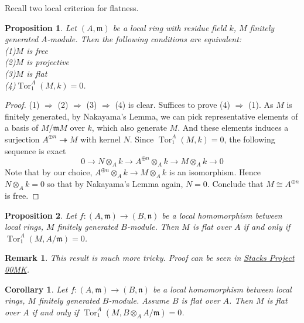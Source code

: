 \documentclass{ctexart}
\newtheorem{remark}{Remark}[section]
\newtheorem{proposition}{Proposition}[section]
\newtheorem{corollary}{Corollary}[section]
\newcommand{\tor}{\operatorname{Tor}}
\begin{document}
Recall two local criterion for flatness.
\begin{proposition}
    Let $(A, \mathfrak{m})$ be a local ring with residue field $k$, $M$ finitely generated $A$-module.
    Then the following conditions are equivalent: \\
    (1)$M$ is free \\
    (2)$M$ is projective \\
    (3)$M$ is flat \\
    (4)$\tor_{1}^{A}(M, k) = 0$.
    \label{Proposition 7.1}
\end{proposition}
\begin{proof}
    (1) $\Rightarrow$ (2) $\Rightarrow$ (3) $\Rightarrow$ (4) is clear.
    Suffices to prove (4) $\Rightarrow$ (1).
    As $M$ is finitely generated, by Nakayama's Lemma, we can pick representative elements of a basis of $M/\mathfrak{m}M$ over $k$, which also generate $M$.
    And these elements induces a surjection $A^{\oplus n} \twoheadrightarrow M$ with kernel $N$.
    Since $\tor_{1}^{A}(M, k) = 0$, the following sequence is exact
    \begin{equation}
        0 \longrightarrow N \otimes_{A} k \longrightarrow A^{\oplus n} \otimes_{A} k \longrightarrow M \otimes_{A} k \longrightarrow 0
    \end{equation}
    Note that by our choice, $A^{\oplus n} \otimes_{A} k \rightarrow M \otimes_{A} k$ is an isomorphism.
    Hence $N \otimes_{A} k = 0$ so that by Nakayama's Lemma again, $N = 0$.
    Conclude that $M \cong A^{\oplus n}$ is free.
\end{proof}
\begin{proposition}
    Let $f: (A, \mathfrak{m}) \rightarrow (B, \mathfrak{n})$ be a local homomorphism between local rings, $M$ finitely generated $B$-module.
    Then $M$ is flat over $A$ if and only if $\tor_{1}^{A}(M, A/\mathfrak{m}) = 0$.
    \label{Proposition 7.2}
\end{proposition}
\begin{remark}
    This result is much more tricky.
    Proof can be seen in \href{https://stacks.math.columbia.edu/tag/00MK}{Stacks Project 00MK}.
\end{remark}
\begin{corollary}
    Let $f: (A, \mathfrak{m}) \rightarrow (B, \mathfrak{n})$ be a local homomorphism between local rings, $M$ finitely generated $B$-module.
    Assume $B$ is flat over $A$.
    Then $M$ is flat over $A$ if and only if $\tor_{1}^{A}(M, B \otimes_{A} A/\mathfrak{m}) = 0$.
    \label{Corollary 7.1}
\end{corollary}
\end{document}
